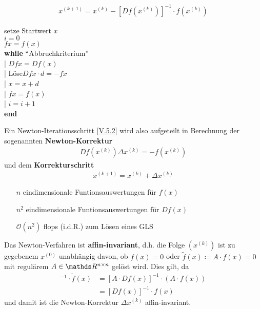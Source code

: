 \begin{gather}
x^{(k+1)} = x^{(k)} -[Df(x^{(k)})]^{-1}\cdot f(x^{(k)})
\label{V.5.2}
\end{gather}

\begin{pseudocode}{0.5\linewidth}
	setze Startwert $x$ \\
	$i=0$ \\
	$fx= f(x)$ \\
	\textbf{while} \enquote{Abbruchkriterium} \\
	|	\> $Dfx = Df(x)$ \\
	|	\> Löse\footnotemark $Dfx\cdot d=-fx$ \\
	|	\> $x=x+d$ \\
	|	\> $fx=f(x)$\\
	|	\> $i=i+1$\\
	\textbf{end}
\end{pseudocode}

\begin{Beme}
	Ein Newton-Iterationsschritt \eqref{V.5.2} wird also aufgeteilt in Berechnung
	der sogenannten \textbf{Newton-Korrektur}
	\begin{gather}
	Df(x^{(k)})\Delta x^{(k)} = -f(x^{(k)}) \label{V.5.3}
	\end{gather}
	und dem \textbf{Korrekturschritt}
	\begin{gather}
	x^{(k+1)}= x^{(k)}+\Delta x^{(k)} \label{V.5.4}
	\end{gather}
\end{Beme}


\begin{itemize}
	\item[\textbf{$n$}] eindimensionale Funtionsauswertungen für $f(x)$
	\item[\textbf{$n^2$}] eindimensionale Funtionsauswertungen für $Df(x)$
	\item[$\mathcal{O}(n^2)$] flops (i.d.R.) zum Lösen eines GLS
\end{itemize}


\begin{Beme}
	\label{5.5.5}
	Das Newton-Verfahren ist \textbf{affin-invariant},
	d.h. die Folge $(x^{(k)})$ ist zu gegebenem $x^{(0)}$ unabhängig davon,
	ob $f(x)=0$ oder $\widetilde{f}(x)\coloneqq A\cdot f(x) =0$
	mit regulärem $A\in \Renn $ gelöst wird.
	Dies gilt, da 
	\begin{align*}
	[D\widetilde{f}(x)]^{-1} \cdot \widetilde{f}(x)
	&= [A\cdot Df(x)]^{-1} \cdot (A\cdot f(x))\\
	&= [Df(x)]^{-1} \cdot f(x)
	\end{align*}
	und damit ist die Newton-Korrektur $\Delta x^{(k)}$ affin-invariant.
\end{Beme}

